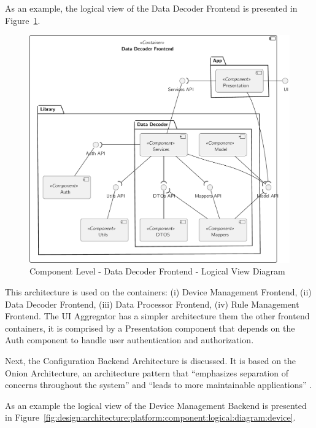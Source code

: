 As an example, the logical view of the Data Decoder Frontend is presented in Figure~\ref{fig:design:architecture:platform:component:logical:diagram:decoder}.

\begin{figure}[H]
   \centering
   \includegraphics[page=1,width=0.7\columnwidth]{assets/diagrams/design/architectural/level3/logical/data-decoder-frontend.pdf}
   \caption[Component Level - Data Decoder Frontend - Logical View Diagram]{Component Level - Data Decoder Frontend - Logical View Diagram}
   \label{fig:design:architecture:platform:component:logical:diagram:decoder}
\end{figure}

This architecture is used on the containers: (i) Device Management Frontend, (ii) Data Decoder Frontend, (iii) Data Processor Frontend, (iv) Rule Management Frontend. The UI Aggregator has a simpler architecture them the other frontend containers, it is comprised by a Presentation component that depends on the Auth component to handle user authentication and authorization.

Next, the Configuration Backend Architecture is discussed. It is based on the Onion Architecture, an architecture pattern that ``emphasizes separation of concerns throughout the system'' and ``leads to more maintainable applications'' \parencite{onion}.

As an example the logical view of the Device Management Backend is presented in Figure~\ref{fig:design:architecture:platform:component:logical:diagram:device}.

